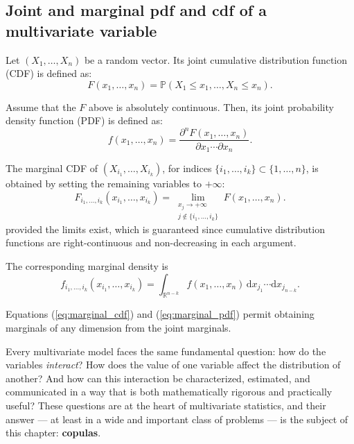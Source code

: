 \subsection{Joint and marginal pdf and cdf of a multivariate variable}\label{subsec:joint_marginal}
\begin{definition}
Let $(X_1,\ldots,X_n)$ be a random vector. Its joint cumulative distribution function (CDF) is defined as:
\begin{equation}\label{eq:joint_cdf}
\boxed{F(x_1,\ldots,x_n)
= \mathbb{P}(X_1 \le x_1,\ldots,X_n \le x_n).}
\end{equation}
\end{definition}
\begin{definition}
 Assume that the $F$ above is absolutely continuous. Then, its joint probability density function (PDF) is defined as:
\begin{equation}\label{eq:joint_pdf}
\boxed{f(x_1,\ldots,x_n)
= \frac{\partial^n F(x_1,\ldots,x_n)}{\partial x_1 \cdots \partial x_n}.}
\end{equation}
\end{definition}
The marginal CDF of $(X_{i_1},\ldots,X_{i_k})$, for indices $\{i_1,\ldots,i_k\} \subset \{1,\ldots,n\}$, is obtained by setting the remaining variables to $+\infty$:
\begin{equation}\label{eq:marginal_cdf}
F_{i_1,\ldots,i_k}(x_{i_1},\ldots,x_{i_k})
=
\lim_{\substack{x_j \to +\infty \\ j \notin \{i_1,\ldots,i_k\}}} F(x_1,\ldots,x_n).
\end{equation}
provided the limits exist, which is guaranteed since cumulative distribution
functions are right-continuous and non-decreasing in each argument.

The corresponding marginal density is
\begin{equation}\label{eq:marginal_pdf}
f_{i_1,\ldots,i_k}(x_{i_1},\ldots,x_{i_k})
=
\int_{\mathbb{R}^{n-k}}
f(x_1,\ldots,x_n)
\,
\mathrm{d}x_{j_1}\cdots\mathrm{d}x_{j_{n-k}}.
\end{equation}

Equations (\ref{eq:marginal_cdf}) and (\ref{eq:marginal_pdf}) permit obtaining marginals of any dimension from the joint marginals.

Every multivariate model faces the same fundamental question: how do the variables
\emph{interact}? How does the value of one variable affect the distribution of another?
And how can this interaction be characterized, estimated, and communicated in a way that
is both mathematically rigorous and practically useful? These questions are at the heart
of multivariate statistics, and their answer — at least in a wide and important class of
problems — is the subject of this chapter: \textbf{copulas}.


